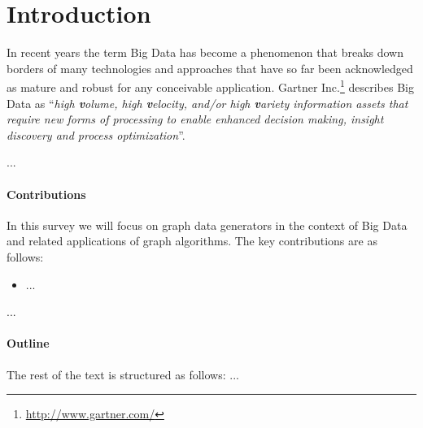 \section{Introduction}
\label{sec:intro}

In recent years the term Big Data has become a phenomenon that breaks down borders of many technologies and approaches that have so far been acknowledged as mature and robust for any conceivable application. Gartner Inc.\footnote{\url{http://www.gartner.com/}} describes Big Data as ``\emph{high \textbf{v}olume, high \textbf{v}elocity, and/or high \textbf{v}ariety information assets that require new forms of processing to enable enhanced decision making, insight discovery and process optimization}''.

...


\paragraph*{Contributions} In this survey we will focus on graph data generators in the context of Big Data and related applications of graph algorithms. The key contributions are as follows:

\begin{itemize}
  \item ...
\end{itemize}

...

\paragraph*{Outline} The rest of the text is structured as follows: ...

